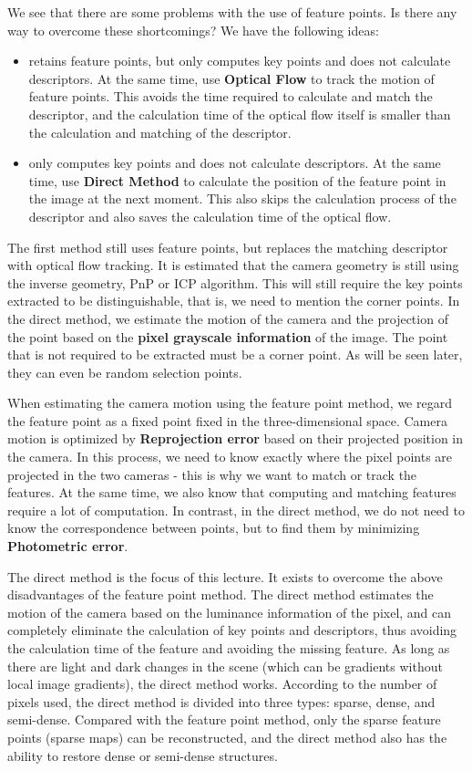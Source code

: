 We see that there are some problems with the use of feature points. Is there any way to overcome these shortcomings? We have the following ideas:

\begin{itemize}
\item retains feature points, but only computes key points and does not calculate descriptors. At the same time, use \textbf{Optical Flow} to track the motion of feature points. This avoids the time required to calculate and match the descriptor, and the calculation time of the optical flow itself is smaller than the calculation and matching of the descriptor.
\item only computes key points and does not calculate descriptors. At the same time, use \textbf{Direct Method} to calculate the position of the feature point in the image at the next moment. This also skips the calculation process of the descriptor and also saves the calculation time of the optical flow.
\end{itemize}

The first method still uses feature points, but replaces the matching descriptor with optical flow tracking. It is estimated that the camera geometry is still using the inverse geometry, PnP or ICP algorithm. This will still require the key points extracted to be distinguishable, that is, we need to mention the corner points. In the direct method, we estimate the motion of the camera and the projection of the point based on the \textbf{pixel grayscale information} of the image. The point that is not required to be extracted must be a corner point. As will be seen later, they can even be random selection points.

When estimating the camera motion using the feature point method, we regard the feature point as a fixed point fixed in the three-dimensional space. Camera motion is optimized by \textbf{Reprojection error} based on their projected position in the camera. In this process, we need to know exactly where the pixel points are projected in the two cameras - this is why we want to match or track the features. At the same time, we also know that computing and matching features require a lot of computation. In contrast, in the direct method, we do not need to know the correspondence between points, but to find them by minimizing \textbf{Photometric error}.

The direct method is the focus of this lecture. It exists to overcome the above disadvantages of the feature point method. The direct method estimates the motion of the camera based on the luminance information of the pixel, and can completely eliminate the calculation of key points and descriptors, thus avoiding the calculation time of the feature and avoiding the missing feature. As long as there are light and dark changes in the scene (which can be gradients without local image gradients), the direct method works. According to the number of pixels used, the direct method is divided into three types: sparse, dense, and semi-dense. Compared with the feature point method, only the sparse feature points (sparse maps) can be reconstructed, and the direct method also has the ability to restore dense or semi-dense structures.

